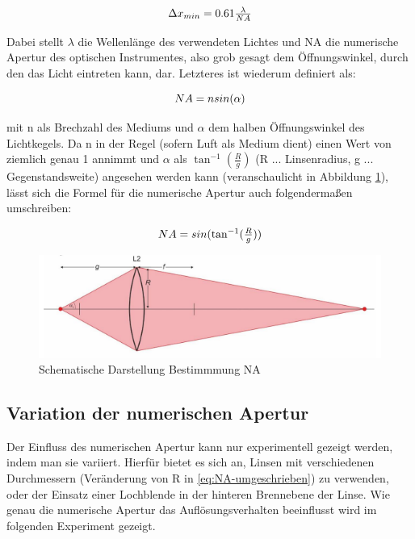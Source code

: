 \documentclass[12pt,a4paper,twoside]{article}
\begin{document}
\begin{equation}
    \label{eq:Auflösungsvermögen}
    \centerline{$\Delta x_{min} = 0.61\frac{\lambda}{NA}$}
\end{equation}

\noindent
Dabei stellt $\lambda$ die Wellenlänge des verwendeten Lichtes und NA die numerische Apertur des optischen Instrumentes, also grob gesagt dem Öffnungswinkel, durch den das Licht eintreten kann, dar.
Letzteres ist wiederum definiert als:

\begin{equation}
    \label{eq:NA}
    \centerline{$NA = n sin(\alpha)$}
\end{equation}

\noindent
mit n als Brechzahl des Mediums und $\alpha$ dem halben Öffnungswinkel des Lichtkegels. Da n in der Regel (sofern Luft als Medium dient) einen Wert von ziemlich genau 1 annimmt und $\alpha$ als $\tan^{-1}(\frac{R}{g})$ (R ... Linsenradius, g ... Gegenstandsweite) angesehen werden kann (veranschaulicht in Abbildung \ref{fig:NA-Skizze}), lässt sich die Formel für die numerische Apertur auch folgendermaßen umschreiben:

\begin{equation}
    \label{eq:NA-umgeschrieben}
    \centerline{$NA = sin(\tan^{-1}(\frac{R}{g}))$}
\end{equation}

\begin{figure}[H]
    \centering
    \includegraphics[width=0.5\linewidth]{nudes/NA-Skizze.png}
    \caption{Schematische Darstellung Bestimmmung NA \cite{teachcenter2}}
    \label{fig:NA-Skizze}
\end{figure}


\subsection{Variation der numerischen Apertur}

Der Einfluss des numerischen Apertur kann nur experimentell gezeigt werden, indem man sie variiert. Hierfür bietet es sich an, Linsen mit verschiedenen Durchmessern (Veränderung von R in \ref{eq:NA-umgeschrieben}) zu verwenden, oder der Einsatz einer Lochblende in der hinteren Brennebene der Linse.
Wie genau die numerische Apertur das Auflösungsverhalten beeinflusst wird im folgenden Experiment gezeigt.
\end{document}

